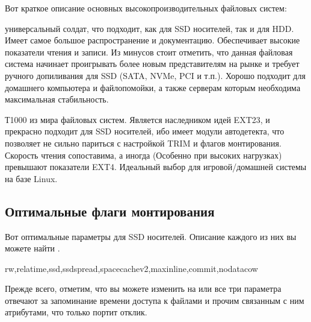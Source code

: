 \documentclass[letterpaper,10pt,russian,openany]{sphinxmanual}
\begin{document}
\sphinxAtStartPar
Вот краткое описание основных высокопроизводительных файловых систем:

\sphinxAtStartPar
{} \sphinxhyphen{} универсальный солдат, что подходит, как для SSD носителей, так и для HDD. Имеет самое большое распространение и документацию.
Обеспечивает высокие показатели чтения и записи.
Из минусов стоит отметить, что данная файловая система начинает проигрывать более новым представителям на рынке и требует ручного допиливания для SSD
(SATA, NVMe, PCI и т.п.).
Хорошо подходит для домашнего компьютера и файлопомойки, а также серверам которым необходима максимальная стабильность.

\sphinxAtStartPar
{} \sphinxhyphen{} Т1000 из мира файловых систем.
Является наследником идей EXT2\sphinxhyphen{}3, и прекрасно подходит для SSD носителей,
ибо имеет модули автодетекта, что позволяет не сильно париться с настройкой TRIM и флагов монтирования.
Скорость чтения сопоставима, а иногда (Особенно при высоких нагрузках) превышают показатели EXT4.
Идеальный выбор для игровой/домашней системы на базе Linux.

\ignorespaces 

\subsection{Оптимальные флаги монтирования}
\label{\detokenize{source/file-systems:mount-options}}\label{\detokenize{source/file-systems:index-1}}\label{\detokenize{source/file-systems:id3}}
\sphinxAtStartPar
Вот оптимальные параметры для SSD носителей.
Описание каждого из них вы можете найти \sphinxhyphen{} .

\begin{sphinxVerbatim}[commandchars=\\\{\}]
rw,relatime,ssd,ssd\PYGZus{}spread,space\PYGZus{}cachev2,max\PYGZus{}inline,commit,nodatacow
\end{sphinxVerbatim}

\sphinxAtStartPar
Прежде всего, отметим, что вы можете изменить  на 
или  \sphinxhyphen{} все три параметра отвечают за запоминание времени доступа к файлами и прочим связанным с ним атрибутами, что только портит отклик.
\end{document}
